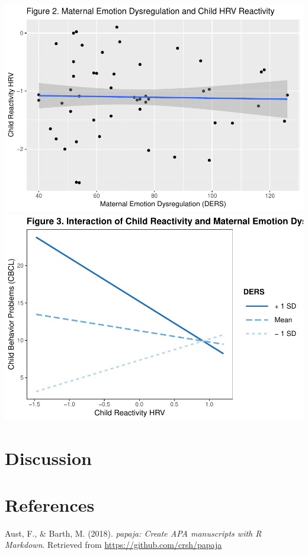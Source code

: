 \documentclass[man]{apa6}
\begin{document}
\includegraphics{DataPrepScript_apa_style_files/figure-latex/plots-2.pdf}
\includegraphics{DataPrepScript_apa_style_files/figure-latex/plots-3.pdf}

\section{Discussion}\label{discussion}

\newpage

\section{References}\label{references}

\begingroup
\setlength{\parindent}{-0.5in} \setlength{\leftskip}{0.5in}

\hypertarget{refs}{}
\hypertarget{ref-R-papaja}{}
Aust, F., \& Barth, M. (2018). \emph{papaja: Create APA manuscripts with
R Markdown}. Retrieved from \url{https://github.com/crsh/papaja}
\end{document}
